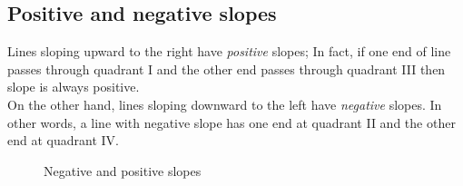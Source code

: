 \subsection{Positive and negative slopes}
Lines sloping upward to the right have \textit{positive} slopes; In fact, if one end of line passes through quadrant I and the other end passes through quadrant III then slope is always positive.\\
On the other hand, lines sloping downward to the left have \textit{negative} slopes. In other words, a line with negative slope has one end at quadrant II and the other end at quadrant IV.
\begin{figure}[ht]
\centering
{}
\quad
{}
\caption{Negative and positive slopes}
\end{figure}
